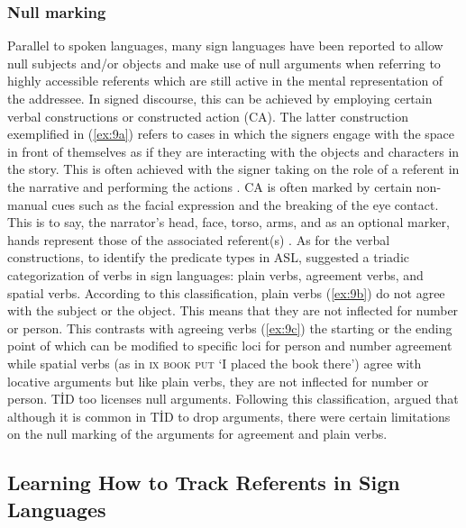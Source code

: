 \documentclass[review]{elsarticle} %
\begin{document}
\hypertarget{null-marking}{%
\subsubsection{Null marking}\label{null-marking}}

Parallel to spoken languages, many sign languages have been reported to
allow null subjects and/or objects and make use of null arguments when
referring to highly accessible referents which are still active in the
mental representation of the addressee. In signed discourse, this can be
achieved by employing certain verbal constructions or constructed action
(CA). The latter construction exemplified in (\ref{ex:9a}) refers to
cases in which the signers engage with the space in front of themselves
as if they are interacting with the objects and characters in the story.
This is often achieved with the signer taking on the role of a referent
in the narrative and performing the actions \citep{metzger1995}. CA is
often marked by certain non-manual cues such as the facial expression
and the breaking of the eye contact. This is to say, the narrator's
head, face, torso, arms, and as an optional marker, hands represent
those of the associated referent(s) \citep{smith2014}. As for the verbal
constructions, to identify the predicate types in ASL,
\citet{padden1986} suggested a triadic categorization of verbs in sign
languages: plain verbs, agreement verbs, and spatial verbs. According to
this classification, plain verbs (\ref{ex:9b}) do not agree with the
subject or the object. This means that they are not inflected for number
or person. This contrasts with agreeing verbs (\ref{ex:9c}) the starting
or the ending point of which can be modified to specific loci for person
and number agreement while spatial verbs (as in \textsc{ix book put} `I
placed the book there') agree with locative arguments but like plain
verbs, they are not inflected for number or person. TİD too licenses
null arguments. Following this classification, \citet{sevinc2006} argued
that although it is common in TİD to drop arguments, there were certain
limitations on the null marking of the arguments for agreement and plain
verbs.

\hypertarget{learning-how-to-track-referents-in-sign-languages}{%
\subsection{Learning How to Track Referents in Sign
Languages}\label{learning-how-to-track-referents-in-sign-languages}}
\end{document}
